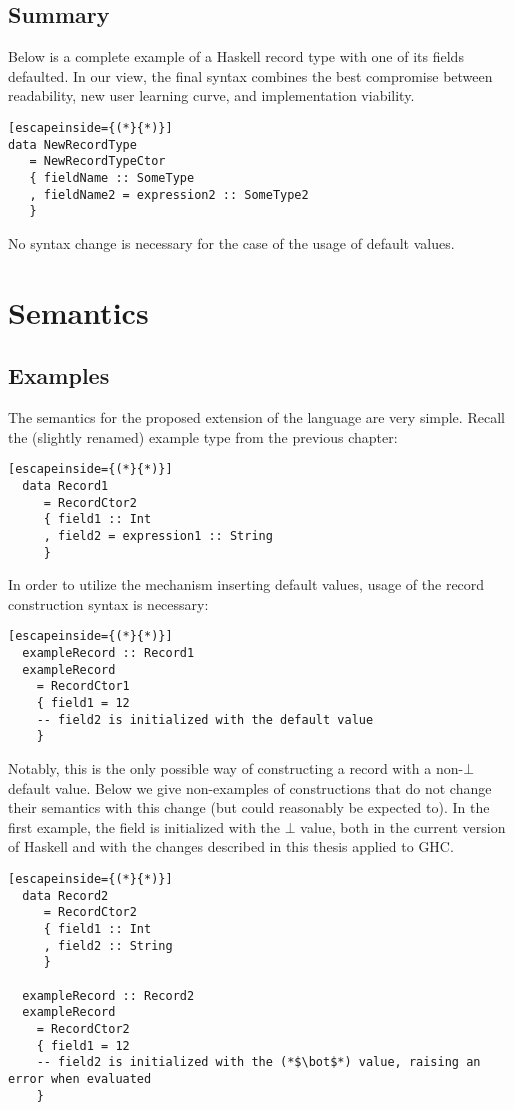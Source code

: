 \documentclass[en]{pracamgr}
\begin{document}
\section{Summary}
Below is a complete example of a Haskell record type with one of its fields defaulted. 
In our view, the final syntax combines the best compromise between readability, new user learning curve, and implementation viability.

\begin{lstlisting}[escapeinside={(*}{*)}]
data NewRecordType
   = NewRecordTypeCtor 
   { fieldName :: SomeType 
   , fieldName2 = expression2 :: SomeType2
   }
\end{lstlisting}
No syntax change is necessary for the case of the usage of default values.


\chapter{Semantics}
\section{Examples}
The semantics for the proposed extension of the language are very simple.
Recall the (slightly renamed) example type from the previous chapter:

\begin{lstlisting}[escapeinside={(*}{*)}]
  data Record1
     = RecordCtor2 
     { field1 :: Int
     , field2 = expression1 :: String
     }
\end{lstlisting}
  
In order to utilize the mechanism inserting default values, usage of the record construction syntax is necessary:

\begin{lstlisting}[escapeinside={(*}{*)}]
  exampleRecord :: Record1
  exampleRecord 
    = RecordCtor1
    { field1 = 12
    -- field2 is initialized with the default value
    }
\end{lstlisting}

Notably, this is the only possible way of constructing a record with a non-$\bot$ default value.
Below we give non-examples of constructions that do not change their semantics with this change (but could reasonably be expected to).
In the first example, the field is initialized with the $\bot$ value, both in the current version of Haskell and with the changes described in this thesis applied to GHC.

\begin{lstlisting}[escapeinside={(*}{*)}]
  data Record2
     = RecordCtor2 
     { field1 :: Int
     , field2 :: String
     }  

  exampleRecord :: Record2
  exampleRecord 
    = RecordCtor2 
    { field1 = 12
    -- field2 is initialized with the (*$\bot$*) value, raising an error when evaluated
    }

\end{lstlisting}
\end{document}
